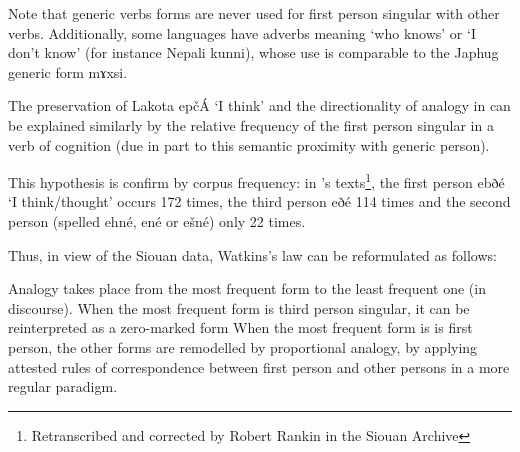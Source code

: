 \documentclass[oldfontcommands,oneside,a4paper,11pt]{article}
\newcommand{\ipa}[1]{{\phon#1}} %
\begin{document}
Note that generic verbs forms are never used for first person singular with other verbs. Additionally, some languages have adverbs meaning `who knows' or `I don't know' (for instance Nepali \ipa{kunni}),  whose use is comparable to the Japhug generic form \ipa{mɤxsi}. 

The preservation of Lakota \ipa{epčÁ} `I think' and the directionality of analogy in can be explained similarly by the relative frequency of the first person singular in a verb of cognition (due in part to this semantic proximity with generic person).


This hypothesis is confirm by corpus frequency: in \citet{dorsey1890cegiha}'s texts\footnote{Retranscribed and corrected by Robert Rankin in the Siouan Archive}, the first person \ipa{ebðé} `I think/thought' occurs 172 times, the third person  \ipa{eðé} 114 times and the second person  (spelled \ipa{ehné}, \ipa{ené} or \ipa{ešné}) only 22 times.  

Thus, in view of the Siouan data, Watkins's law can be reformulated as follows:

\begin{exe}
\ex 
\glt Analogy takes place from the most frequent form to the least frequent one (in discourse). 
\glt When the most frequent form is third person singular, it can be reinterpreted as a zero-marked form
\glt  When the most frequent form is  is first person, the other forms are remodelled by proportional analogy, by applying attested rules of correspondence between first person and other persons in a more regular paradigm.
\end{exe}
 



\end{document}

